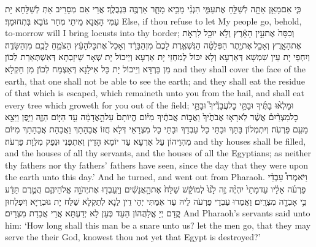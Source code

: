 {כִּ֛י אִם\maqqaf מָאֵ֥ן אַתָּ֖ה לְשַׁלֵּ֣חַ אֶת\maqqaf עַמִּ֑י הִנְנִ֨י מֵבִ֥יא מָחָ֛ר אַרְבֶּ֖ה בִּגְבֻלֶֽךָ׃}
{אֲרֵי אִם מְסָרֵיב אַתְּ לְשַׁלָּחָא יָת עַמִּי הָאֲנָא מֵיתֵי מְחַר גּוֹבָא בִּתְחוּמָךְ׃}
{Else, if thou refuse to let My people go, behold, to-morrow will I bring locusts into thy border;}{}
{וְכִסָּה֙ אֶת\maqqaf עֵ֣ין הָאָ֔רֶץ וְלֹ֥א יוּכַ֖ל לִרְאֹ֣ת אֶת\maqqaf הָאָ֑רֶץ וְאָכַ֣ל \legarmeh  אֶת\maqqaf יֶ֣תֶר הַפְּלֵטָ֗ה הַנִּשְׁאֶ֤רֶת לָכֶם֙ מִן\maqqaf הַבָּרָ֔ד וְאָכַל֙ אֶת\maqqaf כׇּל\maqqaf הָעֵ֔ץ הַצֹּמֵ֥חַ לָכֶ֖ם מִן\maqqaf הַשָּׂדֶֽה׃}
{וְיִחְפֵי יָת עֵין שִׁמְשָׁא דְּאַרְעָא וְלָא יִכּוֹל לְמִחְזֵי יָת אַרְעָא וְיֵיכוֹל יָת שְׁאָר שֵׁיזָבְתָא דְּאִשְׁתְּאַרַת לְכוֹן מִן בַּרְדָּא וְיֵיכוֹל יָת כָּל אִילָנָא דְּאַצְמַח לְכוֹן מִן חַקְלָא׃}
{and they shall cover the face of the earth, that one shall not be able to see the earth; and they shall eat the residue of that which is escaped, which remaineth unto you from the hail, and shall eat every tree which groweth for you out of the field;}{}
{וּמָלְא֨וּ בָתֶּ֜יךָ וּבָתֵּ֣י כׇל\maqqaf עֲבָדֶ֘יךָ֮ וּבָתֵּ֣י כׇל\maqqaf מִצְרַ֒יִם֒ אֲשֶׁ֨ר לֹֽא\maqqaf רָא֤וּ אֲבֹתֶ֙יךָ֙ וַאֲב֣וֹת אֲבֹתֶ֔יךָ מִיּ֗וֹם הֱיוֹתָם֙ עַל\maqqaf הָ֣אֲדָמָ֔ה עַ֖ד הַיּ֣וֹם הַזֶּ֑ה וַיִּ֥פֶן וַיֵּצֵ֖א מֵעִ֥ם פַּרְעֹֽה׃}
{וְיִתְמְלוֹן בָּתָּךְ וּבָתֵּי כָל עַבְדָךְ וּבָתֵּי כָל מִצְרָאֵי דְּלָא חֲזוֹ אֲבָהָתָךְ וַאֲבָהָת אֲבָהָתָךְ מִיּוֹם מִהְוֵיהוֹן עַל אַרְעָא עַד יוֹמָא הָדֵין וְאִתְפְּנִי וּנְפַק מִלְּוָת פַּרְעֹה׃}
{and thy houses shall be filled, and the houses of all thy servants, and the houses of all the Egyptians; as neither thy fathers nor thy fathers’ fathers have seen, since the day that they were upon the earth unto this day.’ And he turned, and went out from Pharaoh.}{}
{וַיֹּאמְרוּ֩ עַבְדֵ֨י פַרְעֹ֜ה אֵלָ֗יו עַד\maqqaf מָתַי֙ יִהְיֶ֨ה זֶ֥ה לָ֙נוּ֙ לְמוֹקֵ֔שׁ שַׁלַּח֙ אֶת\maqqaf הָ֣אֲנָשִׁ֔ים וְיַֽעַבְד֖וּ אֶת\maqqaf יְהֹוָ֣ה אֱלֹהֵיהֶ֑ם הֲטֶ֣רֶם תֵּדַ֔ע כִּ֥י אָבְדָ֖ה מִצְרָֽיִם׃}
{וַאֲמַרוּ עַבְדֵי פַּרְעֹה לֵיהּ עַד אִמַּתִּי יְהֵי דֵין לַנָא לְתַקְלָא שַׁלַּח יָת גּוּבְרַיָּא וְיִפְלְחוּן קֳדָם יְיָ אֱלָהֲהוֹן הַעַד כְּעַן לָא יְדַעְתָּא אֲרֵי אֲבַדַת מִצְרָיִם׃}
{And Pharaoh’s servants said unto him: ‘How long shall this man be a snare unto us? let the men go, that they may serve the \lord\space their God, knowest thou not yet that Egypt is destroyed?’}{}
